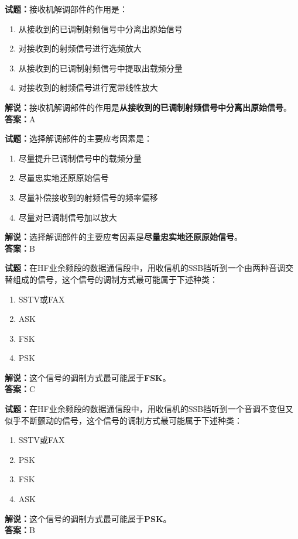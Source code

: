 \documentclass{ctexbook}
\begin{document}
\vspace{1em}

\textbf{试题：}接收机解调部件的作用是：
\begin{enumerate}[leftmargin=3em]
  \item 从接收到的已调制射频信号中分离出原始信号
  \item 对接收到的射频信号进行选频放大
  \item 从接收到的已调制射频信号中提取出载频分量
  \item 对接收到的射频信号进行宽带线性放大
\end{enumerate}
\noindent\textbf{解说：}接收机解调部件的作用是\textbf{从接收到的已调制射频信号中分离出原始信号}。\\\noindent\textbf{答案：}A

\vspace{1em}

\textbf{试题：}选择解调部件的主要应考因素是：
\begin{enumerate}[leftmargin=3em]
  \item 尽量提升已调制信号中的载频分量
  \item 尽量忠实地还原原始信号
  \item 尽量补偿接收到的射频信号的频率偏移
  \item 尽量对已调制信号加以放大
\end{enumerate}
\noindent\textbf{解说：}选择解调部件的主要应考因素是\textbf{尽量忠实地还原原始信号}。\\\noindent\textbf{答案：}B

\vspace{1em}

\textbf{试题：}在HF业余频段的数据通信段中，用收信机的SSB挡听到一个由两种音调交替组成的信号，这个信号的调制方式最可能属于下述种类：
\begin{enumerate}[leftmargin=3em]
  \item SSTV或FAX
  \item ASK
  \item FSK
  \item PSK
\end{enumerate}
\noindent\textbf{解说：}这个信号的调制方式最可能属于\textbf{FSK}。\\\noindent\textbf{答案：}C

\vspace{1em}

\textbf{试题：}在HF业余频段的数据通信段中，用收信机的SSB挡听到一个音调不变但又似乎不断颤动的信号，这个信号的调制方式最可能属于下述种类：
\begin{enumerate}[leftmargin=3em]
  \item SSTV或FAX
  \item PSK
  \item FSK
  \item ASK
\end{enumerate}
\noindent\textbf{解说：}这个信号的调制方式最可能属于\textbf{PSK}。\\\noindent\textbf{答案：}B
\end{document}

